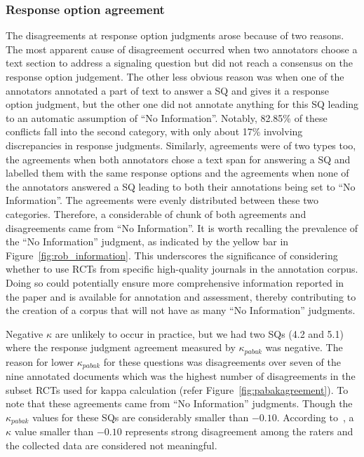 \documentclass[sn-mathphys,Numbered]{sn-jnl}%
\theoremstyle{thmstyleone}%
\theoremstyle{thmstyletwo}%
\theoremstyle{thmstylethree}%
\begin{document}
\subsubsection{Response option agreement}
\label{disc:kappa}
%
The disagreements at response option judgments arose because of two reasons.
The most apparent cause of disagreement occurred when two annotators choose a text section to address a signaling question but did not reach a consensus on the response option judgement.
The other less obvious reason was when one of the annotators annotated a part of text to answer a SQ and gives it a response option judgment, but the other one did not annotate anything for this SQ leading to an automatic assumption of ``No Information''.
Notably, 82.85\% of these conflicts fall into the second category, with only about 17\% involving discrepancies in response judgments.
Similarly, agreements were of two types too, the agreements when both annotators chose a text span for answering a SQ and labelled them with the same response options and the agreements when none of the annotators answered a SQ leading to both their annotations being set to ``No Information''.
The agreements were evenly distributed between these two categories.
Therefore, a considerable of chunk of both agreements and disagreements came from ``No Information''.
It is worth recalling the prevalence of the ``No Information'' judgment, as indicated by the yellow bar in Figure~\ref{fig:rob_information}.
This underscores the significance of considering whether to use RCTs from specific high-quality journals in the annotation corpus.
Doing so could potentially ensure more comprehensive information reported in the paper and is available for annotation and assessment, thereby contributing to the creation of a corpus that will not have as many ``No Information'' judgments.


Negative $\kappa$ are unlikely to occur in practice, but we had two SQs (4.2 and 5.1) where the response judgment agreement measured by $\kappa_{pabak}$ was negative.
The reason for lower $\kappa_{pabak}$ for these questions was disagreements over seven of the nine annotated documents which was the highest number of disagreements in the subset RCTs used for kappa calculation (refer Figure~\ref{fig:pabakagreement}).
To note that these agreements came from ``No Information'' judgments.
Though the $\kappa_{pabak}$ values for these SQs are considerably smaller than $-0.10$.
According to~\cite{mchugh2012interrater}, a $\kappa$ value smaller than $-0.10$ represents strong disagreement among the raters and the collected data are considered not meaningful.
\end{document}
